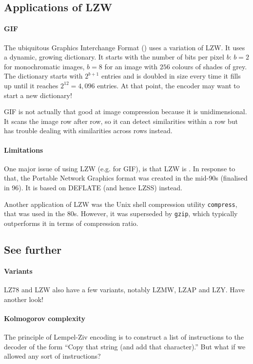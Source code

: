 \documentclass[a4paper, 11pt, openany]{book}
\begin{document}
\subsection{Applications of LZW}

\paragraph{GIF} The ubiquitous Graphics Interchange Format () uses a variation of LZW. It uses a dynamic, growing dictionary. It starts with the number of bits per pixel $b$: $b=2$ for monochromatic images, $b=8$ for an image with $256$ colours of shades of grey. The dictionary starts with $2^{b+1}$ entries and is doubled in size every time it fills up until it reaches $2^{12} = 4,096$ entries. At that point, the encoder may want to start a new dictionary!

GIF is not actually that good at image compression because it is unidimensional. It scans the image row after row, so it can detect similarities within a row but has trouble dealing with similarities across rows instead.

\paragraph{Limitations} One major issue of using LZW (e.g. for GIF), is that LZW is . In response to that, the Portable Network Graphics format was created in the mid-90s (finalised in 96). It is based on DEFLATE (and hence LZSS) instead.

Another application of LZW was the Unix shell compression utility \texttt{compress}, that was used in the 80s. However, it was superseded by \texttt{gzip}, which typically outperforms it in terms of compression ratio.

\subsection{See further}

\paragraph{Variants} LZ78 and LZW also have a few variants, notably LZMW, LZAP and LZY. Have another look!

\paragraph{Kolmogorov complexity} The principle of Lempel-Ziv encoding is to construct a list of instructions to the decoder of the form ``Copy that string (and add that character).'' But what if we allowed any sort of instructions?
\end{document}
